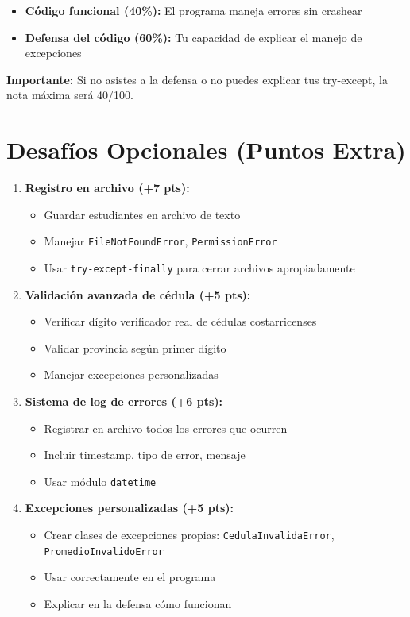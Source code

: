 \documentclass[12pt,a4paper]{article}
\begin{document}
\begin{itemize}
    \item \textbf{Código funcional (40\%):} El programa maneja errores sin crashear
    \item \textbf{Defensa del código (60\%):} Tu capacidad de explicar el manejo de excepciones
\end{itemize}

\textbf{Importante:} Si no asistes a la defensa o no puedes explicar tus try-except, la nota máxima será 40/100.

\section{Desafíos Opcionales (Puntos Extra)}

\begin{enumerate}[leftmargin=*]
    \item \textbf{Registro en archivo (+7 pts):}
    \begin{itemize}
        \item Guardar estudiantes en archivo de texto
        \item Manejar \texttt{FileNotFoundError}, \texttt{PermissionError}
        \item Usar \texttt{try-except-finally} para cerrar archivos apropiadamente
    \end{itemize}
    
    \item \textbf{Validación avanzada de cédula (+5 pts):}
    \begin{itemize}
        \item Verificar dígito verificador real de cédulas costarricenses
        \item Validar provincia según primer dígito
        \item Manejar excepciones personalizadas
    \end{itemize}
    
    \item \textbf{Sistema de log de errores (+6 pts):}
    \begin{itemize}
        \item Registrar en archivo todos los errores que ocurren
        \item Incluir timestamp, tipo de error, mensaje
        \item Usar módulo \texttt{datetime}
    \end{itemize}
    
    \item \textbf{Excepciones personalizadas (+5 pts):}
    \begin{itemize}
        \item Crear clases de excepciones propias: \texttt{CedulaInvalidaError}, \texttt{PromedioInvalidoError}
        \item Usar correctamente en el programa
        \item Explicar en la defensa cómo funcionan
    \end{itemize}
    

\end{enumerate}
\end{document}
